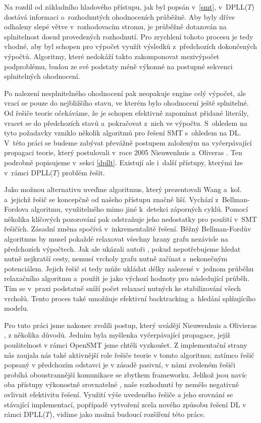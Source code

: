 Na rozdíl od základního hladového přístupu, jak byl popsán v~\ref{smt}, v~DPLL($T$) dostává \Solver informaci o~rozhodnutých ohodnoceních průběžně. Aby byly dříve odhaleny slepé větve v~rozhodovacím stromu, \Solver je průběžně dotazován na splnitelnost dosud provedených rozhodnutí. Pro zrychlení tohoto procesu je tedy vhodné, aby byl schopen pro výpočet využít výsledků z~předchozích dokončených výpočtů. Algoritmy, které nedokáží takto zakomponovat mezivýpočet podproblému, budou ze své podstaty méně výkonné na postupné sekvenci splnitelných ohodnocení.

Po nalezení nesplnitelného ohodnocení pak neopakuje engine celý výpočet, ale vrací se pouze do nejbližšího stavu, ve kterém bylo ohodnocení ještě splnitelné. Od řešiče teorie očekáváme, že je schopen efektivně zapomínat přidané literály, vracet se do předchozích stavů a~pokračovat z~nich ve výpočtu. %
S~ohledem na tyto požadavky vzniklo několik algoritmů pro řešení SMT s~ohledem na DL. V~této práci se budeme zabývat převážně postupem založeným na vyčerpávající propagaci teorie, který postulovali v~roce 2005 Nieuwenhuis a~Oliveras \cite{Nieuwenhuis05}. Ten podrobně popisujeme v~sekci \ref{dpllt}. Existují ale i~další přístupy, kterými lze v~rámci DPLL($T$) problém řešit.

Jako možnou alternativu uveďme algoritmus, který prezentovali Wang a~kol. \cite{Wang05} a~jejichž řešič se koncepčně od našeho přístupu značně liší. Vychází z~Bellman-Fordova algoritmu, využitelného mimo jiné k~detekci záporných cyklů. Pomocí několika klíčových pozorování pak odstraňuje jeho nedostatky pro použití v~SMT řešičích. Zásadní změna spočívá v~inkrementalitě řešení. Běžný Bellman-Fordův algoritmus by musel pokaždé relaxovat všechny hrany grafu nezávisle na předchozích výpočtech. Jak ale ukázali autoři \cite{Wang05}, pokud nepotřebujeme hledat nutně nejkratší cesty, nemusí vrcholy grafu nutně začínat s~nekonečným potenciálem. Jejich řešič si tedy může ukládat délky nalezené v~jednom průběhu relaxačního algoritmu a~použít je jako výchozí hodnoty pro následující průběh. Tím se v~praxi podstatně sníží počet relaxací nutných ke stabilizování všech vrcholů. Tento proces také umožňuje efektivní backtracking a~hledání splňujícího modelu.

Pro tuto práci jsme nakonec zvolili postup, který uvádějí Nieuwenhuis a Olivieras \cite{Nieuwenhuis05}, z několika důvodů. Jedním byla myšlenka vyčerpávající propagace, jejíž použitelnost v rámci OpenSMT jsme chtěli vyzkoušet. Z implementační strany nás zaujala nás také aktivnější role řešiče teorie v tomto algoritmu; zatímco řešič popsaný v předchozím odstavci je v zásadě pasivní, v námi zvoleném řešiči probíhá oboustrannější komunikace se zbytkem frameworku. Jelikož jsou navíc oba přístupy výkonostně srovnatelné \cite{Wang05}, naše rozhodnutí by nemělo negativně ovlivnit efektivitu řešení. Využití výše uvedeného řešiče a jeho srovnání se stávající implementací, popřípadě vytvoření zcela nového způsobu řešení DL v rámci DPLL($T$), vidíme jako možná budoucí rozšíření této práce.

